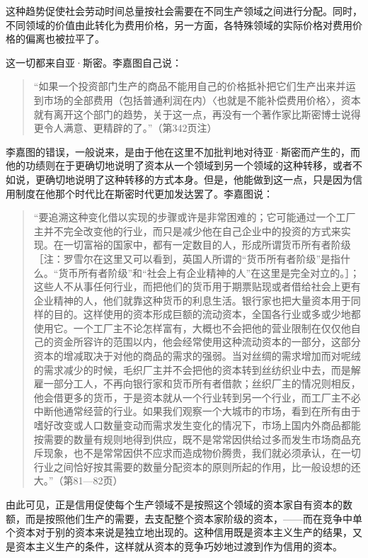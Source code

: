 这种趋势促使社会劳动时间总量按社会需要在不同生产领域之间进行分配。同时，不同领域的价值由此转化为费用价格，另一方面，各特殊领域的实际价格对费用价格的偏离也被拉平了。

这一切都来自亚·斯密。李嘉图自己说：

\begin{quote}{“如果一个投资部门生产的商品不能用自己的价格抵补把它们生产出来并运到市场的全部费用（包括普通利润在内）〈也就是不能补偿费用价格〉，资本就有离开这个部门的趋势，关于这一点，再没有一个著作家比斯密博士说得更令人满意、更精辟的了。”（第342页注）}\end{quote}

李嘉图的错误，一般说来，是由于他在这里不加批判地对待亚·斯密而产生的，而他的功绩则在于更确切地说明了资本从一个领域到另一个领域的这种转移，或者不如说，更确切地说明了这种转移的方式本身。但是，他能做到这一点，只是因为信用制度在他那个时代比在斯密时代更加发达罢了。李嘉图说：

\begin{quote}{“要追溯这种变化借以实现的步骤或许是非常困难的；它可能通过一个工厂主并不完全改变他的行业，而只是减少他在自己企业中的投资的方式来实现。在一切富裕的国家中，都有一定数目的人，形成所谓货币所有者阶级［注：罗雪尔在这里又可以看到，英国人所谓的“货币所有者阶级”是指什么。“货币所有者阶级”和“社会上有企业精神的人”在这里是完全对立的。］；这些人不从事任何行业，而把他们的货币用于期票贴现或者借给社会上更有企业精神的人，他们就靠这种货币的利息生活。银行家也把大量资本用于同样的目的。这样使用的资本形成巨额的流动资本，全国各行业或多或少地都使用它。一个工厂主不论怎样富有，大概也不会把他的营业限制在仅仅他自己的资金所容许的范围以内，他会经常使用这种流动资本的一部分，这部分资本的增减取决于对他的商品的需求的强弱。当对丝绸的需求增加而对呢绒的需求减少的时候，毛织厂主并不会把他的资本转到丝纺织业中去，而是解雇一部分工人，不再向银行家和货币所有者借款；丝织厂主的情况则相反，他会借更多的货币，于是资本就从一个行业转到另一个行业，而工厂主不必中断他通常经营的行业。如果我们观察一个大城市的市场，看到在所有由于嗜好改变或人口数量变动而需求发生变化的情况下，市场上国内外商品都能按需要的数量有规则地得到供应，既不是常常因供给过多而发生市场商品充斥现象，也不是常常因供不应求而造成物价腾贵，我们就必须承认，在一切行业之间恰好按其需要的数量分配资本的原则所起的作用，比一般设想的还大。”（第81—82页）}\end{quote}

由此可见，正是信用促使每个生产领域不是按照这个领域的资本家自有资本的数额，而是按照他们生产的需要，去支配整个资本家阶级的资本，——而在竞争中单个资本对于别的资本来说是独立地出现的。这种信用既是资本主义生产的结果，又是资本主义生产的条件，这样就从资本的竞争巧妙地过渡到作为信用的资本。

